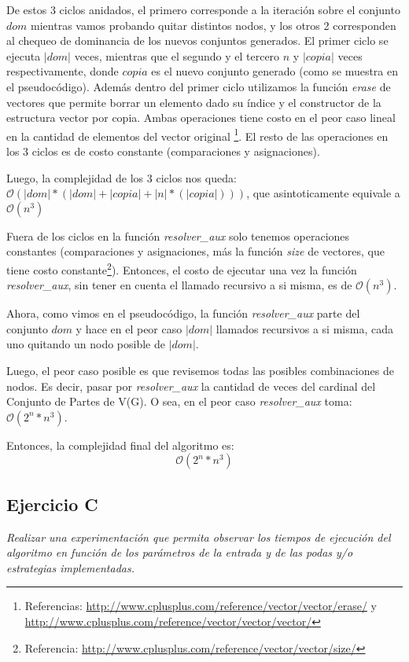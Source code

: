 De estos 3 ciclos anidados, el primero corresponde a la iteración sobre el conjunto $dom$ mientras vamos probando quitar distintos nodos, y los otros 2 corresponden al chequeo de dominancia de los nuevos conjuntos generados.
El primer ciclo se ejecuta $|dom|$ veces, mientras que el segundo y el tercero $n$ y $|copia|$ veces respectivamente, donde $copia$ es el nuevo conjunto generado (como se muestra en el pseudocódigo). Además dentro del primer ciclo utilizamos la función \textit{erase} de vectores que permite borrar un elemento dado su índice y el constructor de la estructura vector por copia. Ambas operaciones tiene costo en el peor caso lineal en la cantidad de elementos del vector original \footnote{Referencias: \url{http://www.cplusplus.com/reference/vector/vector/erase/} y \url{http://www.cplusplus.com/reference/vector/vector/vector/}}. El resto de las operaciones en los 3 ciclos es de costo constante (comparaciones y asignaciones).

Luego, la complejidad de los 3 ciclos nos queda: $\mathcal{O}(|dom|*(|dom| + |copia| + |n|* (|copia|)))$, que asintoticamente equivale a $\mathcal{O}(n^3)$

Fuera de los ciclos en la función \textit{resolver_aux} solo tenemos operaciones constantes (comparaciones y asignaciones, más la función \textit{size} de vectores, que tiene costo constante\footnote{Referencia: \url{http://www.cplusplus.com/reference/vector/vector/size/}}). Entonces, el costo de ejecutar una vez la función \textit{resolver_aux}, sin tener en cuenta el llamado recursivo a si misma, es de $\mathcal{O}(n^3)$.

Ahora, como vimos en el pseudocódigo, la función \textit{resolver_aux} parte del conjunto $dom$ y hace en el peor caso $|dom|$ llamados recursivos a si misma, cada uno quitando un nodo posible de $|dom|$.

Luego, el peor caso posible es que revisemos todas las posibles combinaciones de nodos. Es decir, pasar por \textit{resolver_aux} la cantidad de veces del cardinal del Conjunto de Partes de V(G). O sea, en el peor caso \textit{resolver_aux} toma: $\mathcal{O}(2^n*n^3)$.

Entonces, la complejidad final del algoritmo es:
$$\mathcal{O}(2^n*n^3)$$

\subsection{Ejercicio C}

\textit{Realizar una experimentación que permita observar los tiempos de ejecución del algoritmo en función de los parámetros de la entrada y de las podas y/o estrategias implementadas.}
\medskip

